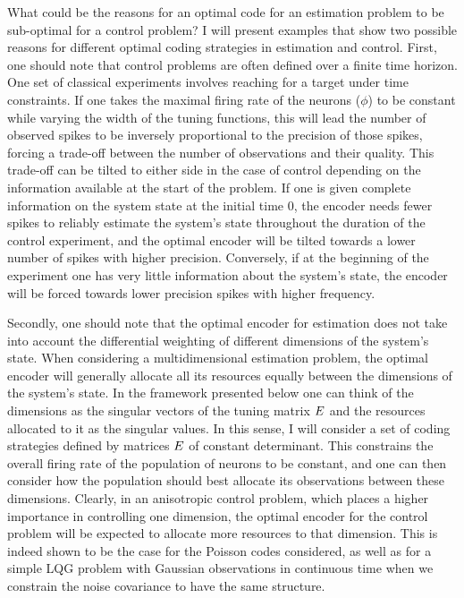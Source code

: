 What could be the reasons for an optimal code for an estimation problem to be sub-optimal for a control problem? I will present examples that show two possible
reasons for different optimal coding strategies in estimation and control. First, one should note that control problems are often defined over a finite time horizon. One
set of classical experiments involves reaching for a target under time constraints. If one takes the maximal firing
rate of the neurons ($\phi$) to be constant while varying the width of the tuning functions, this will lead the number of observed spikes to be inversely proportional to
the precision of those spikes, forcing a trade-off between the number of observations and their quality. This trade-off can be tilted to either side in
the case of control depending on the information available at the start of the problem. If one is given complete information on the system state at the initial time $0$,
the encoder needs fewer spikes to reliably estimate the system's state throughout the duration of the control experiment,
and the optimal encoder will be tilted towards a lower number of spikes with higher precision.
Conversely, if at the beginning of the experiment one has very little information about the system's state, the encoder will be
forced towards lower precision spikes with higher frequency.\par

Secondly, one should note that the optimal encoder for estimation does not take into account the differential weighting of different dimensions of the system's state.
When considering a multidimensional estimation problem, the optimal encoder will generally allocate all its resources equally between the dimensions of the system's
state. In the framework presented below one can think of the dimensions as the singular vectors of the tuning matrix $E$ and the resources allocated to it as the
singular values. In this sense, I will consider a set of coding strategies defined by matrices $E$ of constant determinant.
This constrains the overall firing rate of the
population of neurons to be constant, and one can then consider how the population should best allocate its observations between these dimensions. Clearly, in an
anisotropic control problem, which places a higher importance in controlling one dimension, the optimal encoder for the control problem will be expected to allocate
more resources to that dimension. This is indeed shown to be the case for the Poisson codes considered, as well as for a simple LQG problem with Gaussian observations in 
continuous time when we constrain the noise covariance to have the same structure.\par

